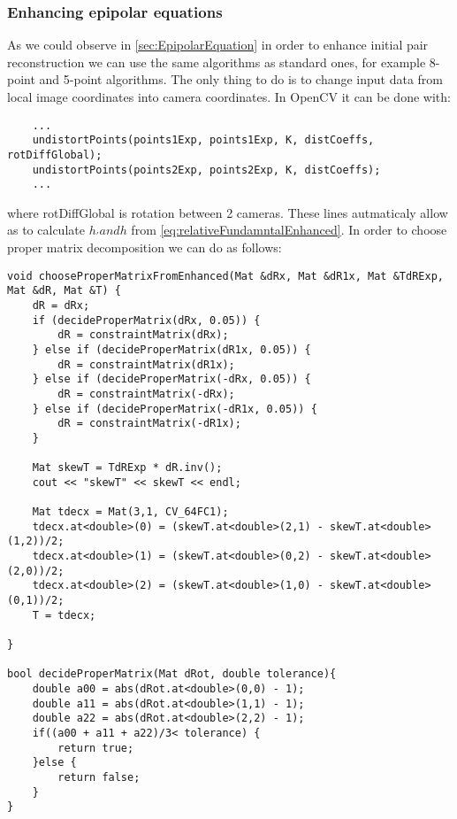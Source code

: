 \subsubsection{Enhancing epipolar equations}
As we could observe in \ref{sec:EpipolarEquation} in order to enhance initial pair reconstruction we can use the same algorithms as standard ones, for example 8-point and 5-point algorithms. The only thing to do is to change input data from local image coordinates into camera coordinates. In OpenCV it can be done  with:
\begin{lstlisting}
    ...
    undistortPoints(points1Exp, points1Exp, K, distCoeffs, rotDiffGlobal);
    undistortPoints(points2Exp, points2Exp, K, distCoeffs);
    ...
\end{lstlisting}
where rotDiffGlobal is rotation between 2 cameras.
These lines autmaticaly allow as to calculate $h_{'} and h$ from \ref{eq:relativeFundamntalEnhanced}. In order to choose proper matrix decomposition we can do as follows:
\begin{lstlisting}
void chooseProperMatrixFromEnhanced(Mat &dRx, Mat &dR1x, Mat &TdRExp, Mat &dR, Mat &T) {
    dR = dRx;
    if (decideProperMatrix(dRx, 0.05)) {
        dR = constraintMatrix(dRx);
    } else if (decideProperMatrix(dR1x, 0.05)) {
        dR = constraintMatrix(dR1x);
    } else if (decideProperMatrix(-dRx, 0.05)) {
        dR = constraintMatrix(-dRx);
    } else if (decideProperMatrix(-dR1x, 0.05)) {
        dR = constraintMatrix(-dR1x);
    }

    Mat skewT = TdRExp * dR.inv();
    cout << "skewT" << skewT << endl;

    Mat tdecx = Mat(3,1, CV_64FC1);
    tdecx.at<double>(0) = (skewT.at<double>(2,1) - skewT.at<double>(1,2))/2;
    tdecx.at<double>(1) = (skewT.at<double>(0,2) - skewT.at<double>(2,0))/2;
    tdecx.at<double>(2) = (skewT.at<double>(1,0) - skewT.at<double>(0,1))/2;
    T = tdecx;

}

bool decideProperMatrix(Mat dRot, double tolerance){
    double a00 = abs(dRot.at<double>(0,0) - 1);
    double a11 = abs(dRot.at<double>(1,1) - 1);
    double a22 = abs(dRot.at<double>(2,2) - 1);
    if((a00 + a11 + a22)/3< tolerance) {
        return true;
    }else {
        return false;
    }
}
\end{lstlisting}


